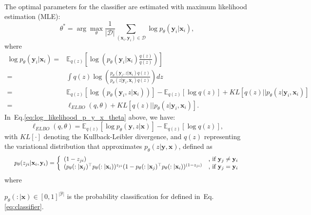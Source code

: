 \documentclass[review]{elsarticle}
\theoremstyle{plain}
\begin{document}
The optimal parameters for the classifier are estimated with maximum likelihood estimation (MLE):
\begin{equation}
    \theta^* = \arg\max_{\theta}  \frac{1}{|\mathcal{D}|}\sum_{(\mathbf{x}_i,\mathbf{y}_i) \in \mathcal{D}} \log p_{\theta}(\mathbf{y}_i|\mathbf{x}_i),
    \label{eq:main_likelihood}
\end{equation}
where
\begin{equation}
\begin{split}
    \log p_{\theta}(\mathbf{y}_i|\mathbf{x}_i) =& \mathbb{E}_{q(z)} \left [ \log \left ( p_{\theta}(\mathbf{y}_i|\mathbf{x}_i)\frac{q(z)}{q(z)} \right ) \right ] 
    \\
    =&\int q(z) \log\left( \frac{p_{\theta}(\mathbf{y}_i,z|\mathbf{x}_i)q(z)}{p_{\theta}(z|\mathbf{y}_i,\mathbf{x}_i)q(z)} \right)dz \\
    =&\mathbb{E}_{q(z)}[\log(p_{\theta}(\mathbf{y}_i,z|\mathbf{x}_i))] -\mathbb{E}_{q(z)}[\log q(z) ] + KL[q(z)||p_{\theta}(z|\mathbf{y}_i,\mathbf{x}_i)] \\
    =& \ell_{ELBO}(q,\theta)+KL[q(z)||p_{\theta}(z|\mathbf{y}_i,\mathbf{x}_i)].
\end{split}
\label{eq:log_likelihood_p_y_x_theta}
\end{equation}
In~Eq.\ref{eq:log_likelihood_p_y_x_theta} above, we have:
\begin{equation}
\ell_{ELBO}(q,\theta) = \mathbb{E}_{q(z)}[\log p_{\theta}(\mathbf{y},z|\mathbf{x})]-\mathbb{E}_{q(z)}[\log q(z) ],   
\label{eq:elbo}
\end{equation}
 with $KL[\cdot]$ denoting the Kullback-Leibler divergence, and $q(z)$ representing the variational distribution that approximates $p_{\theta}(z|\mathbf{y},\mathbf{x})$, defined as
\begin{equation}
\scalebox{0.9}{
$p_{\theta} (z_{ji}|  \mathbf{x}_i  , \mathbf{y}_i) = \left \{
\begin{array}{ll}
  (1 - z_{ji}) & \text{, if }  \mathbf{y}_j \neq  \mathbf{y}_i\\
  (p_{\theta}(:|\mathbf{x}_j)^{\top}p_{\theta}(:|\mathbf{x}_i))^{z_{ji}} 
      (1-p_{\theta}(:|\mathbf{x}_j)^{\top}p_{\theta}(:|\mathbf{x}_i))^{(1-z_{ji})} & \text{, if }  \mathbf{y}_j =  \mathbf{y}_i\end{array}
\right.$}
    \label{eq:p_z_given_y_x_}
\end{equation}
where 

$p_{\theta}(:|\mathbf{x}) \in [0,1]^{|\mathcal{Y}|}$ is the probability classification for defined in~Eq.\ref{eq:classifier}.
\end{document}
